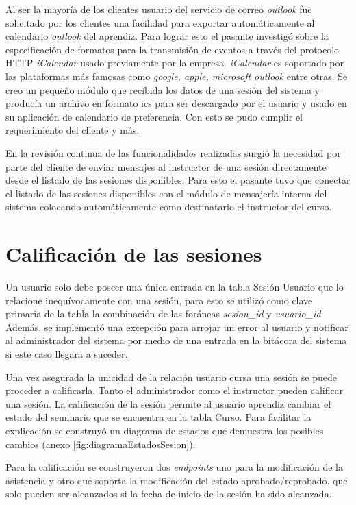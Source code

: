 	Al ser la mayoría de los clientes usuario del servicio de correo \emph{outlook} fue solicitado por los clientes una facilidad para exportar automáticamente al calendario \emph{outlook} del aprendiz. Para lograr esto el pasante investigó sobre la especificación de formatos para la transmisión de eventos a través del protocolo HTTP \emph{iCalendar} usado previamente por la empresa. \emph{iCalendar} es soportado por las plataformas más famosas como \emph{google, apple, microsoft outlook} entre otras. Se creo un pequeño módulo que recibida los datos de una sesión del sistema y producía un archivo en formato ics para ser descargado por el usuario y usado en su aplicación de calendario de preferencia. Con esto se pudo cumplir el requerimiento del cliente y más.

	En la revisión continua de las funcionalidades realizadas surgió la necesidad por parte del cliente de enviar mensajes al instructor de una sesión directamente desde el listado de las sesiones disponibles. Para esto el pasante tuvo que conectar el listado de las sesiones disponibles con el módulo de mensajería interna del sistema colocando automáticamente como destinatario el instructor del curso.

	\section{Calificación de las sesiones} %
	\label{sec:calificación_de_las_sesiones}
	
	Un usuario solo debe poseer una única entrada en la tabla Sesión-Usuario que lo relacione inequívocamente con una sesión, para esto se utilizó como clave primaria de la tabla la combinación de las foráneas \emph{sesion\_id} y \emph{usuario\_id}. Además, se implementó una excepción para arrojar un error al usuario y notificar al administrador del sistema por medio de una entrada en la bitácora del sistema si este caso llegara a suceder.

	Una vez asegurada la unicidad de la relación usuario cursa una sesión se puede proceder a calificarla. Tanto el administrador como el instructor pueden calificar una sesión. La calificación de la sesión permite al usuario aprendiz cambiar el estado del seminario que se encuentra en la tabla Curso. Para facilitar la explicación se construyó un diagrama de estados que demuestra los posibles cambios (anexo \ref{fig:diagramaEstadosSesion}). 

	Para la calificación se construyeron dos \emph{endpoints} uno para la modificación de la asistencia y otro que soporta la modificación del estado aprobado/reprobado. que solo pueden ser alcanzados si la fecha de inicio de la sesión ha sido alcanzada.

